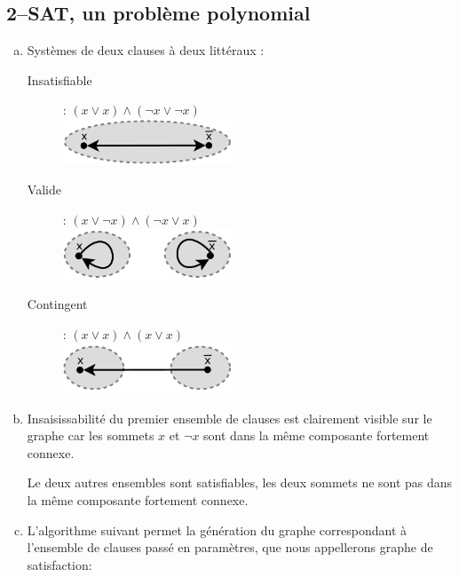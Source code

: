 \subsection{2--SAT, un problème polynomial}
\begin{enumerate}[(a)]
\item Systèmes de deux clauses à deux littéraux :
\begin{description}
\item[Insatisfiable] : $(x \vee x) \wedge (\neg x \vee \neg x)$ \\
\includegraphics[width=5cm]{files/g1ex3.pdf}
\item[Valide] : $(x \vee \neg x) \wedge (\neg x \vee x)$ \\
\includegraphics[width=5cm]{files/g2ex3.pdf}
\item[Contingent] : $(x \vee x) \wedge (x \vee x)$ \\
\includegraphics[width=5cm]{files/g3ex3.pdf}
\end{description}
\item 

Insaisissabilité du premier ensemble de clauses est clairement visible sur le graphe car les sommets $x$ et $\neg x$ sont dans la même composante fortement connexe.

Le deux autres ensembles sont satisfiables, les deux sommets ne sont pas dans la même composante fortement connexe.


\item L'algorithme suivant permet la génération du graphe correspondant à l'ensemble de clauses passé en paramètres, que nous appellerons graphe de satisfaction:


\end{enumerate}

